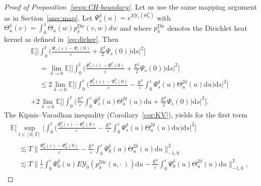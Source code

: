 \documentclass[AHL,Unicode,longabstracts]{cedram}
\DeclareMathOperator{\Dir}{Dir}
\newcommand{\mc}[1]{{\mathcal #1}}
\renewcommand{\mc}[1]{{\mathcal #1}}
\renewcommand{\leq}{\leqslant}
\newcommand*{\dd}{\mathrm{d}}
\newcommand*{\ds}{\dd s}
\newcommand*{\du}{\dd u}
\begin{document}
\begin{proof}[Proof of Proposition~\ref{prop:CH-boundary}]
Let us use the same mapping argument as in Section~\ref{ssec:map}. Let $\Psi_s^\delta(u) = e^{E \mc Y_s(\Theta^\delta_u)}$ with $\Theta^\delta_u(v) = \int_0^1 \Theta_u(w) p_\delta^{\Dir}(v,w) dw$ and where $p_\delta^{\Dir}$ denotes the Dirichlet heat kernel as defined in~\eqref{eq:dirker}. Then
\begin{multline}\label{eq:CH-boundary-pr1}
\mathbb{E} \bigg[\bigg| \int_0^t \bigg(\frac{\Psi_s (\varepsilon) - \Psi_s(0)}{\varepsilon} + \frac{E^2}{2} \Psi_s(0) \bigg) \ds \bigg|^2 \bigg] \\
\begin{aligned}
& = \lim_{\delta \to 0} \mathbb{E} \bigg[\bigg| \int_0^t \bigg(\frac{\Psi^\delta_s (\varepsilon) - \Psi^\delta_s(0)}{\varepsilon} + \frac{E^2}{2} \Psi_s(0) \bigg) \ds \bigg|^2 \bigg] \\
& \leq 2 \lim_{\delta \to 0}\mathbb{E} \bigg[\bigg| \int_0^t \bigg(\frac{\Psi^\delta_s (\varepsilon) - \Psi^\delta_s(0)}{\varepsilon} - \frac{E^2}{\varepsilon} \int_0^\varepsilon \Psi^\delta_s(u) \Theta^{2\delta}_u(u) \du \bigg) \ds \bigg|^2 \bigg]
\end{aligned} \\
+ 2 \lim_{\delta \to 0} \mathbb{E} \bigg[\bigg| \int_0^t \bigg(\frac{E^2}{\varepsilon} \int_0^\varepsilon \Psi^\delta_s(u) \Theta^{2\delta}_u(u) \du + \frac{E^2}{2} \Psi_s(0) \bigg) \ds \bigg|^2 \bigg].
\end{multline}
The Kipnis--Varadhan inequality (Corollary~\ref{cor:KV}), yields for the first term
\begin{multline*}
\mathbb{E} \bigg[\sup_{t \in [0,T]} \bigg| \int_0^t \bigg(\frac{\Psi^\delta_s (\varepsilon) - \Psi^\delta_s(0)}{\varepsilon} - \frac{E^2}{\varepsilon} \int_0^\varepsilon \Psi^\delta_s(u) \Theta^{2\delta}_u(u) \du \bigg)\ds \bigg|^2 \bigg] \\
\begin{aligned}
& \lesssim T \bigg\| \frac{\Psi^\delta_0 (\varepsilon) - \Psi^\delta_0(0)}{\varepsilon} - \frac{E^2}{\varepsilon} \int_0^\varepsilon \Psi^\delta_0(u) \Theta^{2\delta}_u(u) \du \bigg\|_{-1,0}^2 \\
& \lesssim T \bigg\| \frac{1}{\varepsilon} \int_0^\varepsilon \Psi^\delta_0 (u) E \mc Y_0(p^{\Dir}_\delta(u,\cdot\,)) \du - \frac{E^2}{\varepsilon} \int_0^\varepsilon \Psi^\delta_0(u) \Theta^{2\delta}_u(u) \du \bigg\|_{-1,0}^2,
\end{aligned}
\end{multline*}

\end{proof}
\end{document}
